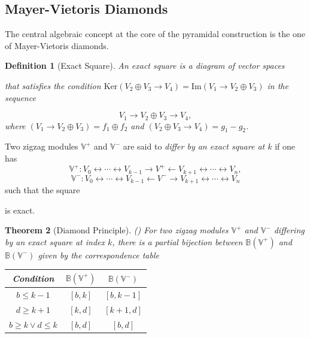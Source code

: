 \documentclass[11pt]{article}
\newtheorem{theorem}{Theorem}[section]
\newtheorem{definition}[theorem]{Definition}
\theoremstyle{remark}
\newcommand{\V}{\mathbb{V}}
\newcommand{\B}{\mathbb{B}}
\begin{document}
\subsection{Mayer-Vietoris Diamonds}

The central algebraic concept at the core of the pyramidal construction is the one of Mayer-Vietoris diamonds.

\begin{definition}[Exact Square]
An \emph{exact square} is a diagram of vector spaces 
\begin{center}
\end{center}
that satisfies the condition $\mathrm{Ker}(V_2\oplus V_3\rightarrow V_4)=\mathrm{Im}(V_1\rightarrow V_2\oplus V_3)$ in the sequence 

$$V_1\longrightarrow V_2\oplus V_3\longrightarrow V_4,$$
where $(V_1\rightarrow V_2\oplus V_3)=f_1\oplus f_2$ and $(V_2\oplus V_3\rightarrow V_4)=g_1-g_2$.
\end{definition}

Two zigzag modules $\V^+$ and $\V^-$ are said to \textit{differ by an exact square at $k$} if one has $$\V^+:V_0\longleftrightarrow \cdots\longleftrightarrow V_{k-1}\longrightarrow V^+\longleftarrow V_{k+1}\longleftrightarrow\cdots\longleftrightarrow V_n,$$
$$\V^-:V_0\longleftrightarrow \cdots\longleftrightarrow V_{k-1}\longleftarrow V^-\longrightarrow V_{k+1}\longleftrightarrow\cdots\longleftrightarrow V_n$$ such that the square  
\begin{center}
\end{center}
is exact. 
\begin{theorem}[Diamond Principle](\autocite[Theorem~ 5.6]{carlsson2008zigzag})
For two zigzag modules $\V^+$ and $\V^-$ differing by an exact square at index $k$, there is a partial bijection between $\B({\V^+})$ and $\B({\V^-})$ given by the correspondence table 
\begin{center}
\begin{tabular}{|c c c|} 
 \hline
Condition & $\B({\V^+})$ & $\B({\V^-})$\\ [0.5ex] 
 \hline
 $b\leq k-1$ & $[b,k]$ & $[b,k-1]$ \\ 
\hline
 $d\geq k+1$ & $[k,d]$ & $[k+1,d]$\\
 \hline
 $b\geq k\lor d\leq k$ & $[b, d]$ & $[b, d]$ \\
 \hline
\end{tabular}
\end{center}
\end{theorem}
\end{document}
